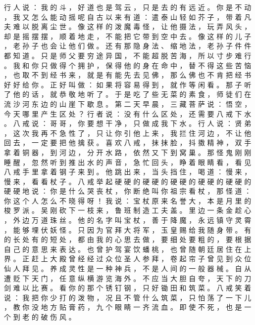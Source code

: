 {行 人 说 ： 我 的 斗 ， 好 道 也 是 驾 云 ， 只 是 去 的 有 远 近 。
你 是 不 动 ， 我 又 怎 么 能 动 摇 呢 自 古 以 来 有 道 ： 遣 泰 山 轻 如 芥 子 ， 带 着 凡 夫 难 以 脱 离 尘 世 。
像 这 样 的 泼 魔 毒 怪 ， 让 他 摄 法 ， 玩 弄 风 头 ， 却 是 摇 摆 摆 ， 顺 着 地 走 ， 不 能 把 它 带 到 空 中 去 。
像 这 样 的 儿 子 ， 老 孙 子 也 会 让 他 们 做 。
还 有 那 隐 身 法 、 缩 地 法 ， 老 孙 子 件 件 都 知 道 。
只 是 师 父 要 穷 途 异 国 ， 不 能 超 脱 苦 海 ， 所 以 寸 步 难 行 。
我 和 你 只 做 得 个 拥 护 ， 保 得 他 的 身 在 命 中 ， 替 不 得 这 些 苦 恼 ， 也 取 不 到 经 书 来 ， 就 是 有 能 先 去 见 佛 ， 那 么 佛 也 不 肯 把 经 书 好 好 给 你 。
正 好 叫 做 ： 如 果 将 容 易 得 到 ， 就 作 等 闲 看 。
那 子 听 了 他 的 话 ， 就 恭 敬 地 听 了 。
于 是 吃 了 些 无 菜 的 素 食 ， 师 徒 们 在 流 沙 河 东 边 的 山 崖 下 歇 息 。
第 二 天 早 晨 ， 三 藏 菩 萨 说 ： 悟 空 ， 今 天 哪 里 产 生 区 处 ？ 行 者 说 ： 没 有 什 么 区 处 ， 还 需 要 八 戒 下 水 。
八 戒 说 ： 哥 哥 ， 你 要 想 干 净 ， 只 做 成 我 下 水 。
行 人 说 ： 贤 弟 ， 这 次 我 再 不 急 性 了 ， 只 让 你 引 他 上 来 ， 我 拦 住 河 边 ， 不 让 他 回 去 ， 一 定 要 把 他 擒 获 。
喜 欢 八 戒 ， 抹 抹 脸 ， 抖 擞 精 神 ， 双 手 拿 着 铜 器 ， 到 河 边 ， 分 开 水 路 ， 依 然 又 下 到 窝 巢 。
那 怪 鬼 刚 刚 睡 醒 ， 忽 然 听 到 推 出 水 的 声 音 ， 急 忙 回 头 ， 睁 着 眼 睛 看 ， 看 见 八 戒 手 里 拿 着 钢 子 来 到 。
他 跳 出 来 ， 当 头 挡 住 ， 喝 道 ： 慢 来 ， 慢 来 ， 看 看 杖 子 。
八 戒 举 起 硬 硬 的 硬 硬 的 硬 硬 的 硬 硬 的 硬 硬 的 硬 硬 地 说 ： 你 是 什 么 哭 丧 杖 ， 你 断 绝 叫 你 祖 宗 看 杖 ， 那 怪 道 ： 你 这 个 人 怎 么 不 晓 得 呀 ！
我 说 ： 宝 杖 原 来 名 誉 大 ， 本 是 月 里 的 梭 罗 派 。
吴 刚 砍 下 一 枝 来 ， 鲁 班 制 造 工 夫 盖 。
里 边 一 条 金 趁 心 ， 外 边 万 道 珠 丝 。
他 的 名 字 叫 宝 杖 ， 善 于 降 魔 ， 永 远 镇 守 灵 霄 ， 能 够 埋 伏 妖 怪 。
只 因 为 官 拜 大 将 军 ， 玉 皇 赐 给 我 随 身 带 。
有 的 长 处 有 的 短 处 ， 都 由 我 的 心 思 去 做 ， 要 细 处 要 粗 的 ， 要 根 据 自 己 的 意 思 来 表 达 。
也 曾 护 驾 宴 饮 蟠 桃 ， 也 曾 随 朝 廷 居 住 在 上 界 。
正 赶 上 大 殿 曾 经 经 过 众 位 圣 人 参 拜 ， 卷 起 帘 子 曾 见 到 众 位 仙 人 拜 见 。
养 成 灵 性 是 一 种 神 兵 ， 不 是 人 间 的 一 般 器 械 。
自 从 遭 贬 下 天 门 ， 任 意 纵 横 游 览 海 外 。
不 应 当 大 胆 自 夸 ， 天 下 的 刀 剑 难 以 比 赛 。
看 你 的 那 个 锈 钉 钢 ， 只 好 锄 田 和 筑 菜 。
八 戒 笑 着 说 ： 我 把 你 少 打 的 泼 物 ， 况 且 不 管 什 么 筑 菜 ， 只 怕 荡 了 一 下 儿 ， 教 你 没 地 方 贴 膏 药 ， 九 个 眼 睛 一 齐 流 血 。
即 使 不 死 ， 也 是 一 个 到 老 的 破 伤 风 。
}

